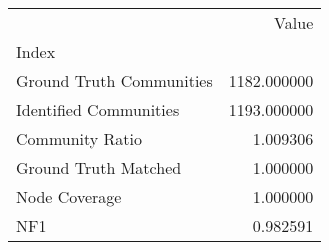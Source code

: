 \begin{tabular}{lr}
\toprule
{} &        Value \\
Index                    &              \\
\midrule
Ground Truth Communities &  1182.000000 \\
Identified Communities   &  1193.000000 \\
Community Ratio          &     1.009306 \\
Ground Truth Matched     &     1.000000 \\
Node Coverage            &     1.000000 \\
NF1                      &     0.982591 \\
\bottomrule
\end{tabular}

